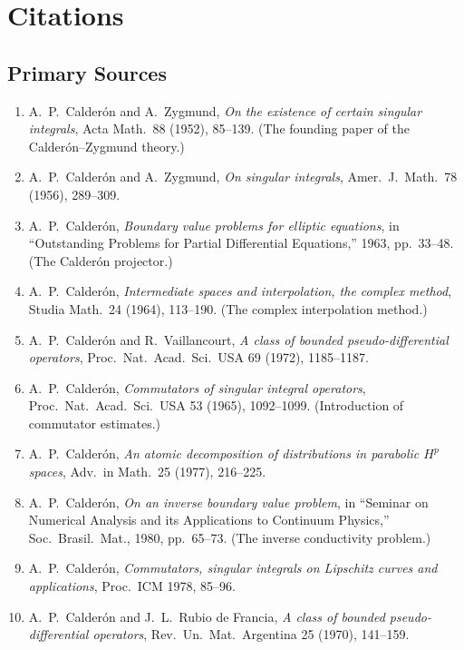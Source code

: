 \section{Citations}\subsection*{Primary Sources}
\begin{enumerate}
    \item A.\ P.\ Calder\'{o}n and A.\ Zygmund, \textit{On the existence of certain singular integrals}, Acta Math.\ 88 (1952), 85--139. (The founding paper of the Calder\'{o}n--Zygmund theory.)
    \item A.\ P.\ Calder\'{o}n and A.\ Zygmund, \textit{On singular integrals}, Amer.\ J.\ Math.\ 78 (1956), 289--309.
    \item A.\ P.\ Calder\'{o}n, \textit{Boundary value problems for elliptic equations}, in ``Outstanding Problems for Partial Differential Equations,'' 1963, pp.\ 33--48. (The Calder\'{o}n projector.)
    \item A.\ P.\ Calder\'{o}n, \textit{Intermediate spaces and interpolation, the complex method}, Studia Math.\ 24 (1964), 113--190. (The complex interpolation method.)
    \item A.\ P.\ Calder\'{o}n and R.\ Vaillancourt, \textit{A class of bounded pseudo-differential operators}, Proc.\ Nat.\ Acad.\ Sci.\ USA 69 (1972), 1185--1187.
    \item A.\ P.\ Calder\'{o}n, \textit{Commutators of singular integral operators}, Proc.\ Nat.\ Acad.\ Sci.\ USA 53 (1965), 1092--1099. (Introduction of commutator estimates.)
    \item A.\ P.\ Calder\'{o}n, \textit{An atomic decomposition of distributions in parabolic $H^p$ spaces}, Adv.\ in Math.\ 25 (1977), 216--225.
    \item A.\ P.\ Calder\'{o}n, \textit{On an inverse boundary value problem}, in ``Seminar on Numerical Analysis and its Applications to Continuum Physics,'' Soc.\ Brasil.\ Mat., 1980, pp.\ 65--73. (The inverse conductivity problem.)
    \item A.\ P.\ Calder\'{o}n, \textit{Commutators, singular integrals on Lipschitz curves and applications}, Proc.\ ICM 1978, 85--96.
    \item A.\ P.\ Calder\'{o}n and J.\ L.\ Rubio de Francia, \textit{A class of bounded pseudo-differential operators}, Rev.\ Un.\ Mat.\ Argentina 25 (1970), 141--159.
\end{enumerate}

